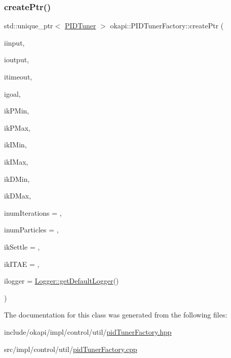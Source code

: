 \mbox{\label{classokapi_1_1PIDTunerFactory_ac57e059e968377f93864ba28a793ea1d}} 
\subsubsection{\texorpdfstring{createPtr()}{createPtr()}}
{\footnotesize\ttfamily std\+::unique\+\_\+ptr$<$ \mbox{\hyperlink{classokapi_1_1PIDTuner}{P\+I\+D\+Tuner}} $>$ okapi\+::\+P\+I\+D\+Tuner\+Factory\+::create\+Ptr (\begin{DoxyParamCaption}\item[{const std\+::shared\+\_\+ptr$<$ \mbox{\hyperlink{classokapi_1_1ControllerInput}{Controller\+Input}}$<$ double $>$$>$ \&}]{iinput,  }\item[{const std\+::shared\+\_\+ptr$<$ \mbox{\hyperlink{classokapi_1_1ControllerOutput}{Controller\+Output}}$<$ double $>$$>$ \&}]{ioutput,  }\item[{Q\+Time}]{itimeout,  }\item[{std\+::int32\+\_\+t}]{igoal,  }\item[{double}]{ik\+P\+Min,  }\item[{double}]{ik\+P\+Max,  }\item[{double}]{ik\+I\+Min,  }\item[{double}]{ik\+I\+Max,  }\item[{double}]{ik\+D\+Min,  }\item[{double}]{ik\+D\+Max,  }\item[{std\+::int32\+\_\+t}]{inum\+Iterations = {},  }\item[{std\+::int32\+\_\+t}]{inum\+Particles = {},  }\item[{double}]{ik\+Settle = {},  }\item[{double}]{ik\+I\+T\+AE = {},  }\item[{const std\+::shared\+\_\+ptr$<$ \mbox{\hyperlink{classokapi_1_1Logger}{Logger}} $>$ \&}]{ilogger = {\ttfamily \mbox{\hyperlink{classokapi_1_1Logger_a5053cf778b4b55acba788a3797dc96d2}{Logger\+::get\+Default\+Logger}}()} }\end{DoxyParamCaption})\hspace{0.3cm}{\ttfamily [static]}}



The documentation for this class was generated from the following files\+:\begin{DoxyCompactItemize}
\item 
include/okapi/impl/control/util/\mbox{\hyperlink{pidTunerFactory_8hpp}{pid\+Tuner\+Factory.\+hpp}}\item 
src/impl/control/util/\mbox{\hyperlink{pidTunerFactory_8cpp}{pid\+Tuner\+Factory.\+cpp}}\end{DoxyCompactItemize}
